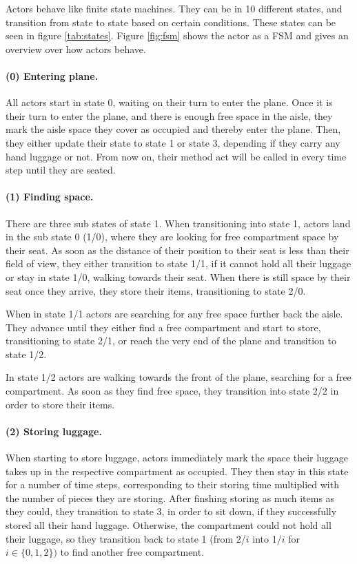 \documentclass[11pt]{article}
\begin{document}
Actors behave like finite state machines. They can be in 10 different states, and transition from state to state based on certain conditions. These states can be seen in figure \ref{tab:states}. Figure \ref{fig:fsm} shows the actor as a FSM and gives an overview over how actors behave.

\paragraph{(0) Entering plane.} All actors start in state 0, waiting on their turn to enter the plane. Once it is their turn to enter the plane, and there is enough free space in the aisle, they mark the aisle space they cover as occupied and thereby enter the plane. Then, they either update their state to state 1 or state 3, depending if they carry any hand luggage or not. From now on, their method act will be called in every time step until they are seated.

\paragraph{(1) Finding space.}
There are three sub states of state 1. When transitioning into state 1, actors land in the sub state 0 (1/0), where they are looking for free compartment space by their seat. As soon as the distance of their position to their seat is less than their field of view, they either transition to state 1/1, if it cannot hold all their luggage or stay in state 1/0, walking towards their seat. When there is still space by their seat once they arrive, they store their items, transitioning to state 2/0.

When in state 1/1 actors are searching for any free space further back the aisle. They advance until they either find a free compartment and start to store, transitioning to state 2/1, or reach the very end of the plane and transition to state 1/2.

In state 1/2 actors are walking towards the front of the plane, searching for a free compartment. As soon as they find free space, they transition into state 2/2 in order to store their items.

\paragraph{(2) Storing luggage.}
When starting to store luggage, actors immediately mark the space their luggage takes up in the respective compartment as occupied. They then stay in this state for a number of time steps, corresponding to their storing time multiplied with the number of pieces they are storing. After finshing storing as much items as they could, they transition to state 3, in order to sit down, if they successfully stored all their hand luggage. Otherwise, the compartment could not hold all their luggage, so they transition back to state 1 (from 2/$i$ into 1/$i$ for $i \in \{0,1,2\})$ to find another free compartment.
\end{document}
